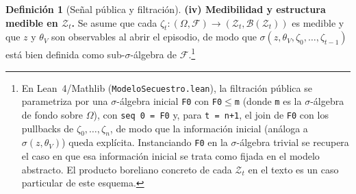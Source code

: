 \documentclass[12pt]{article}
\theoremstyle{definition}
\newtheorem{definition}[theorem]{Definición}
\theoremstyle{remark}
\newcommand{\1}{\mathbf{1}}
\begin{document}
\begin{definition}[Señal pública y filtración]
\smallskip
\noindent\textbf{\textup{(iv)} Medibilidad y estructura medible en $\mathcal{Z}_t$.}\quad
Se asume que cada $\zeta_t:(\Omega,\mathcal{F})\to(\mathcal{Z}_t,\mathcal{B}(\mathcal{Z}_t))$ es medible y que $z$ y $\theta_V$ son observables al abrir el episodio, de modo que $\sigma(z,\theta_V,\zeta_0,\ldots,\zeta_{t-1})$ está bien definida como sub-$\sigma$-álgebra de $\mathcal{F}$.\footnote{En Lean~4/Mathlib \textup{(}\texttt{ModeloSecuestro.lean}\textup{)}, la filtración pública se parametriza por una $\sigma$-álgebra inicial \texttt{F0} con \texttt{F0}$\le$\texttt{m} \textup{(}donde \texttt{m} es la $\sigma$-álgebra de fondo sobre $\Omega$\textup{)}, con \texttt{seq 0 = F0} y, para \texttt{t = n+1}, el join de \texttt{F0} con los pullbacks de $\zeta_0,\ldots,\zeta_n$, de modo que la información inicial \textup{(}análoga a $\sigma(z,\theta_V)$\textup{)} queda explícita. Instanciando \texttt{F0} en la $\sigma$-álgebra trivial se recupera el caso en que esa información inicial se trata como fijada en el modelo abstracto. El producto boreliano concreto de cada $\mathcal{Z}_t$ en el texto es un caso particular de este esquema.}
\end{definition}
\end{document}
